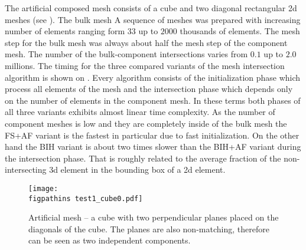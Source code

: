 % 

The artificial composed mesh consists of a cube and two diagonal rectangular 2d meshes (see ). The bulk mesh 
A sequence of meshes was prepared with increasing number of elements ranging
form $33$ up to $2000$ thousands of elements. The mesh step for the bulk mesh was always about half the mesh step of the component mesh. 
The number of the bulk-component intersections varies from $0.1$ up to $2.0$ millions. The timing for the three compared variants
of the mesh intersection algorithm is shown on . Every algorithm consists of the initialization phase which process all elements of the mesh 
and the intersection phase which depends only on the number of elements in the component mesh. In these terms both phases of all three variants exhibits almost 
linear time complexity. As the number of component meshes is low and they are completely inside of the bulk mesh the FS+AF variant is the fastest in particular
due to fast initialization. On the other hand the BIH variant is about two times slower than the BIH+AF variant during the intersection phase. 
That is roughly related to the average fraction of the non-intersecting 3d element in the bounding box of a 2d element.


\begin{figure}[!htb]
    \centering
    \texttt{[image: \\figpathins test1\_cube0.pdf]}
    \caption{Artificial mesh -- a cube with two perpendicular planes placed on the diagonals of the cube.
             The planes are also non-matching, therefore can be seen as two independent components.}
    \label{fig:cube_mesh}
\end{figure}
  
